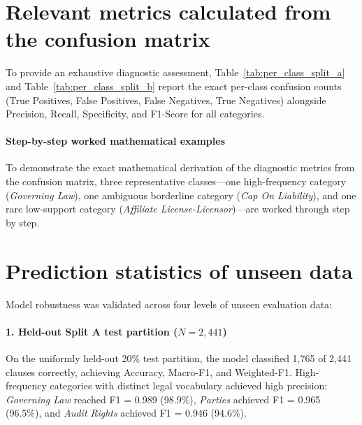 \section{Relevant metrics calculated from the confusion matrix}
\label{sec:metrics_from_cm}

To provide an exhaustive diagnostic assessment, Table~\ref{tab:per_class_split_a} and Table~\ref{tab:per_class_split_b} report the exact per-class confusion counts (True Positives, False Positives, False Negatives, True Negatives) alongside Precision, Recall, Specificity, and F1-Score for all \NumClasses{} categories.



\newpage


\paragraph*{Step-by-step worked mathematical examples}
To demonstrate the exact mathematical derivation of the diagnostic metrics from the confusion matrix, three representative classes---one high-frequency category (\textit{Governing Law}), one ambiguous borderline category (\textit{Cap On Liability}), and one rare low-support category (\textit{Affiliate License-Licensor})---are worked through step by step.



\section{Prediction statistics of unseen data}
\label{sec:unseen_data}

Model robustness was validated across four levels of unseen evaluation data:

\paragraph*{1. Held-out Split A test partition ($N = 2,441$)}
On the uniformly held-out 20\% test partition, the model classified 1,765 of 2,441 clauses correctly, achieving \FinalSplitAAcc{} Accuracy, \FinalSplitAMacroFScore{} Macro-F1, and \FinalSplitAWeightedFScore{} Weighted-F1. High-frequency categories with distinct legal vocabulary achieved high precision: \textit{Governing Law} reached F1 = 0.989 (98.9\%), \textit{Parties} achieved F1 = 0.965 (96.5\%), and \textit{Audit Rights} achieved F1 = 0.946 (94.6\%).

